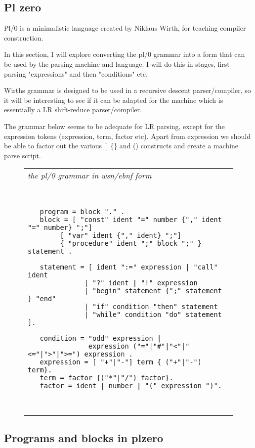 \documentclass[a4paper,12pt]{article}
\begin{document}
\subsection{Pl zero}

  Pl/0 is a minimalistic language created by Niklaus Wirth, for
  teaching compiler construction.

  In this section, I will explore converting the pl/0 grammar
  into a form that can be used by the parsing machine and
  language. I will do this in stages, first parsing "expressions"
  and then "conditions" etc.
  
  Wirths grammar is designed to be used in a recursive descent
  parser/compiler, so it will be interesting to see if it can be adapted for
  the machine which is essentially a LR shift-reduce parser/compiler.

  The grammar below seems to be adequate for LR parsing, except for
  the expression tokens (expression, term, factor etc). Apart from
  expression we should be able to factor out the various [] \{\} and ()
  constructs and create a machine parse script.
 \begin{figure}
 \begin{tabular}{ l }
 \emph{ the pl/0 grammar in wsn/ebnf form } \\ 
 \begin{lstlisting}[breaklines] 


   program = block "." .
   block = [ "const" ident "=" number {"," ident "=" number} ";"]
        [ "var" ident {"," ident} ";"]
        { "procedure" ident ";" block ";" } statement .

   statement = [ ident ":=" expression | "call" ident 
              | "?" ident | "!" expression 
              | "begin" statement {";" statement } "end" 
              | "if" condition "then" statement 
              | "while" condition "do" statement ].

   condition = "odd" expression |
               expression ("="|"#"|"<"|"<="|">"|">=") expression .
   expression = [ "+"|"-"] term { ("+"|"-") term}.
   term = factor {("*"|"/") factor}.
   factor = ident | number | "(" expression ")".

  
 \end{lstlisting} 
 \end{tabular} 

 \end{figure}
  
\subsection{Programs and blocks in plzero}
\end{document}

